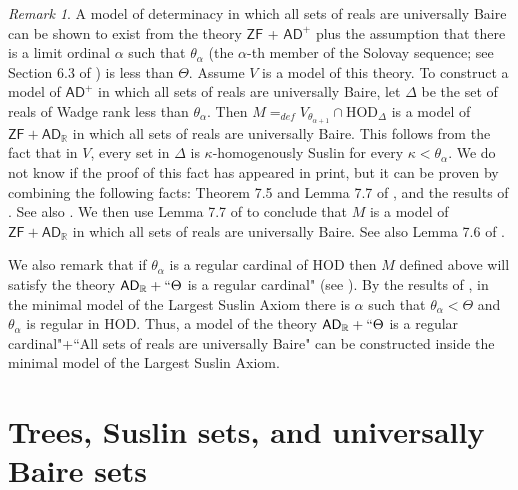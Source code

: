 \documentclass[fleqn, 11pt]{amsart}
\theoremstyle{plain}
\theoremstyle{definition}
\theoremstyle{remark}
\newtheorem{rem}[thm]{Remark} \newtheorem*{rem*}{Remark}
\newcommand{\HOD}{\mathrm{HOD}}
\newcommand{\bbR}{\mathbb{R}}
\newcommand{\ZF}{\mathsf{ZF}}
\newcommand{\AD}{\mathsf{AD}}
\newcommand{\ADR}{\mathsf{AD}_{\bbR}}
\begin{document}
\begin{rem}
	A model of determinacy in which all sets of reals are universally Baire can be shown to exist from the theory $\ZF$ + $\AD^+$ plus the assumption that there is a limit ordinal $\alpha$ such that $\theta_\alpha$ (the $\alpha$-th member of the Solovay sequence; see Section 6.3 of \cite{Larson:Extensions}) is less than $\Theta$.  Assume $V$ is a model of this theory.
	To construct a model of $\AD^+$ in which all sets of reals are universally Baire, let $\Delta$ be the set of reals of Wadge rank less than $\theta_\alpha$. Then $M=_{def}V_{\theta_{\alpha+1}}\cap \HOD_{\Delta}$ is a model of $\ZF+ \ADR$ in which all sets of reals are universally Baire. This follows from the fact that in $V$, every set in $\Delta$ is $\kappa$-homogenously Suslin for every $\kappa<\theta_\alpha$. We do not know if the proof of this fact has appeared in print, but it can be proven by combining the following facts: Theorem 7.5 and Lemma 7.7 of \cite{SteDMT}, and the results of \cite{KKMW}. See also \cite{MarWooWeaklyHom}. We then use Lemma 7.7 of  \cite{SteDMT} to conclude that $M$ is a model of $\ZF+ \ADR$ in which all sets of reals are universally Baire. See also Lemma 7.6 of \cite{SteDMT}.

We also remark that if $\theta_\alpha$ is a regular cardinal of $\HOD$ then $M$ defined above will satisfy the theory $\ADR+``\Theta$ is a regular cardinal" (see \cite{CLSSSZSquares}). By the results of \cite{LSA}, in the minimal model of the Largest Suslin Axiom there is $\alpha$ such that $\theta_\alpha<\Theta$ and $\theta_\alpha$ is regular in $\HOD$. Thus, a model of the theory $\ADR+``\Theta$ is a regular cardinal"+``All sets of reals are universally Baire" can be constructed inside the minimal model of the Largest Suslin Axiom. 

\end{rem}
	 



\section{Trees, Suslin sets, and universally Baire sets}\label{sec-Suslin-uB}
\end{document}

